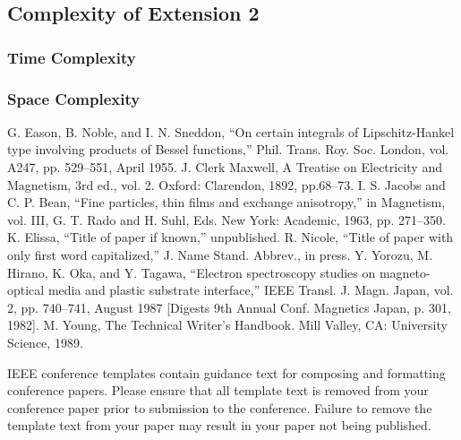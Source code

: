 \documentclass[conference]{IEEEtran}
\begin{document}
\subsection{Complexity of Extension 2}

\subsubsection{Time Complexity}

\subsubsection{Space Complexity}
\begin{thebibliography}{00}
 G. Eason, B. Noble, and I. N. Sneddon, ``On certain integrals of Lipschitz-Hankel type involving products of Bessel functions,'' Phil. Trans. Roy. Soc. London, vol. A247, pp. 529--551, April 1955.
 J. Clerk Maxwell, A Treatise on Electricity and Magnetism, 3rd ed., vol. 2. Oxford: Clarendon, 1892, pp.68--73.
 I. S. Jacobs and C. P. Bean, ``Fine particles, thin films and exchange anisotropy,'' in Magnetism, vol. III, G. T. Rado and H. Suhl, Eds. New York: Academic, 1963, pp. 271--350.
 K. Elissa, ``Title of paper if known,'' unpublished.
 R. Nicole, ``Title of paper with only first word capitalized,'' J. Name Stand. Abbrev., in press.
 Y. Yorozu, M. Hirano, K. Oka, and Y. Tagawa, ``Electron spectroscopy studies on magneto-optical media and plastic substrate interface,'' IEEE Transl. J. Magn. Japan, vol. 2, pp. 740--741, August 1987 [Digests 9th Annual Conf. Magnetics Japan, p. 301, 1982].
 M. Young, The Technical Writer's Handbook. Mill Valley, CA: University Science, 1989.
\end{thebibliography}
\vspace{12pt}
\color{red}
IEEE conference templates contain guidance text for composing and formatting conference papers. Please ensure that all template text is removed from your conference paper prior to submission to the conference. Failure to remove the template text from your paper may result in your paper not being published.
\end{document}
